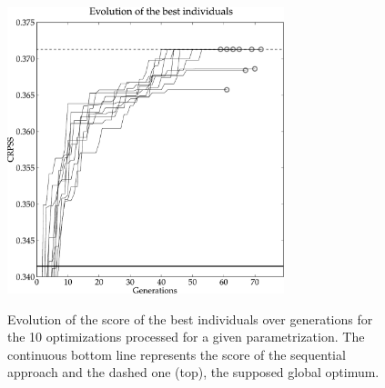 \documentclass{ametsoc}
\begin{document}
\begin{figure}[t]
	\begin{center}
		\noindent\includegraphics[width=19pc,angle=0]{fig02.pdf}\\
	\end{center}
	\caption{Evolution of the score of the best individuals over generations for the 10 optimizations processed for a given parametrization. The continuous bottom line represents the score of the sequential approach and the dashed one (top), the supposed global optimum.}
	\label{fig:gas_evolution_good}
\end{figure}
\end{document}
